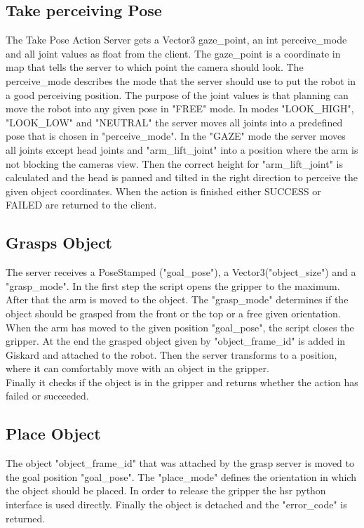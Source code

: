 \documentclass[main.tex]{subfiles}
\begin{document}
	\subsection{Take perceiving Pose}
	The Take Pose Action Server gets a Vector3 gaze\_point, an int perceive\_mode and all joint values as float from the client. The gaze\_point is a coordinate in map that tells the server to which point the camera should look. The perceive\_mode describes the mode that the server should use to put the robot in a good perceiving position. The purpose of the joint values is that planning can move the robot into any given pose in "FREE" mode. In modes "LOOK\_HIGH", "LOOK\_LOW" and "NEUTRAL" the server moves all joints into a predefined pose that is chosen in "perceive\_mode". In the "GAZE" mode the server moves all joints except head joints and "arm\_lift\_joint" into a position where the arm is not blocking the cameras view. Then the correct height for "arm\_lift\_joint" is calculated and the head is panned and tilted in the right direction to perceive the given object coordinates. When the action is finished either SUCCESS or FAILED are returned to the client.

	\vspace{1cm}
	
	\subsection{Grasps Object}
	The server receives a PoseStamped ("goal\_pose"), a Vector3("object\_size") and a "grasp\_mode". In the first step the script opens the gripper to the maximum. After that the arm is moved to the object. The "grasp\_mode" determines if the object should be grasped from the front or the top or a free given orientation. When the arm has moved to the given position "goal\_pose", the script closes the gripper. At the end the grasped object given by "object\_frame\_id" is added in Giskard and attached to the robot. Then the server transforms to a position, where it can comfortably move with an object in the gripper.\\
	Finally it checks if the object is in the gripper and returns whether the action has failed or succeeded.
	
	\vspace{1cm}
	
	\subsection{Place Object}
	The object "object\_frame\_id" that was attached by the grasp server is moved to the goal position "goal\_pose". The "place\_mode" defines the orientation in which the object should be placed. In order to release the gripper the hsr python interface is used directly. Finally the object is detached and the "error\_code" is returned.
	
\end{document}
